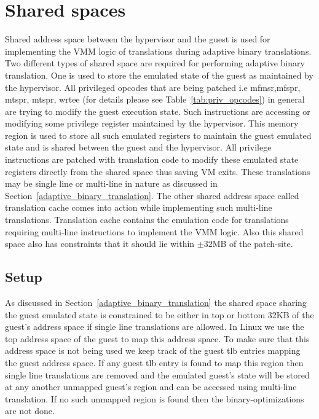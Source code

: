 \chapter{Shared spaces}\label{ch:4}
\label{sec:shared_space}

Shared address space between the hypervisor and the guest is used for implementing the VMM logic of translations during adaptive binary translations. Two different types of shared space are required for performing adaptive binary translation. One is used to store the emulated state of the guest as maintained by the hypervisor. All privileged opcodes that are being patched i.e mfmsr,mfspr, mtspr, mtspr, wrtee (for details please see Table~\ref{tab:priv_opcodes}) in general are trying to modify the guest execution state. Such instructions are accessing or modifying some privilege register maintained by the hypervisor. This memory region is used to store all such emulated registers to maintain the guest emulated state and is shared between the guest and the hypervisor. All privilege instructions are patched with translation code to modify these emulated state registers directly from the shared space thus saving VM exits. These translations may be single line or multi-line in nature as discussed in Section~\ref{adaptive_binary_translation}. The other shared address space called translation cache comes into action while implementing such multi-line translations. Translation cache contains the emulation code for translations requiring multi-line instructions to implement the VMM logic. Also this shared space also has constraints that it should lie within $\pm$32MB of the patch-site.

\section{Setup}
\label{setup_space}
As discussed in Section~\ref{adaptive_binary_translation} the shared space sharing the guest emulated state is constrained to be either in top or bottom 32KB of the guest's address space if single line translations are allowed. In Linux we use the top address space of the guest to map this address space. To make sure that this address space is not being used we keep track of the guest tlb entries mapping the guest address space. If any guest tlb entry is found to map this region then single line translations are removed and the emulated guest's state will be stored at any another unmapped guest's region and can be accessed using multi-line translation. If no such unmapped region is found then the binary-optimizations are not done.

